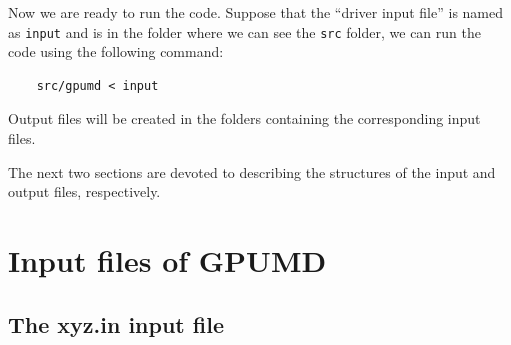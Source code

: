 \documentclass[12pt,a4paper]{report}
\begin{document}
Now we are ready to run the code. Suppose that the ``driver input file'' is named as \verb"input" and is in the folder where we can see the \verb"src" folder, we can run the code using the following command:
\begin{verbatim}
    src/gpumd < input
\end{verbatim}
Output files will be created in the folders containing the corresponding input files.

The next two sections are devoted to describing the structures of the input and output files, respectively.




\section{Input files of GPUMD}


\subsection{The xyz.in input file}
\end{document}
